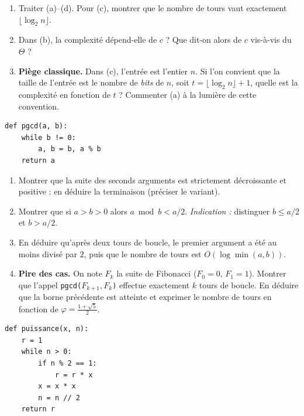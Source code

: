 \documentclass[11pt,a4paper]{article}
\begin{document}
\begin{enumerate}[label=\arabic*.,leftmargin=*]
  \item Traiter (a)--(d). Pour (c), montrer que le nombre de tours vaut exactement
        $\lfloor \log_2 n\rfloor$.
  \item Dans (b), la complexité dépend-elle de $c$ ? Que dit-on alors de $c$ vis-à-vis
        du $\Theta$ ?
  \item \textbf{Piège classique.} Dans (c), l'entrée est l'entier $n$. Si l'on convient
        que la taille de l'entrée est le nombre de \emph{bits} de $n$, soit
        $t=\lfloor\log_2 n\rfloor+1$, quelle est la complexité en fonction de $t$ ?
        Commenter (a) à la lumière de cette convention.
\end{enumerate}

\begin{lstlisting}
def pgcd(a, b):
    while b != 0:
        a, b = b, a % b
    return a
\end{lstlisting}

\begin{enumerate}[label=\arabic*.,leftmargin=*]
  \item Montrer que la suite des seconds arguments est strictement décroissante et
        positive : en déduire la terminaison (préciser le variant).
  \item Montrer que si $a > b > 0$ alors $a \bmod b < a/2$.
        \emph{Indication :} distinguer $b\le a/2$ et $b > a/2$.
  \item En déduire qu'après deux tours de boucle, le premier argument a été au moins
        divisé par $2$, puis que le nombre de tours est $O(\log \min(a,b))$.
  \item \textbf{Pire des cas.} On note $F_k$ la suite de Fibonacci ($F_0=0$, $F_1=1$).
        Montrer que l'appel \texttt{pgcd(}$F_{k+1},F_k$\texttt{)} effectue exactement
        $k$ tours de boucle. En déduire que la borne précédente est atteinte et
        exprimer le nombre de tours en fonction de $\varphi=\frac{1+\sqrt5}{2}$.
\end{enumerate}

\begin{lstlisting}
def puissance(x, n):
    r = 1
    while n > 0:
        if n % 2 == 1:
            r = r * x
        x = x * x
        n = n // 2
    return r
\end{lstlisting}
\end{document}
